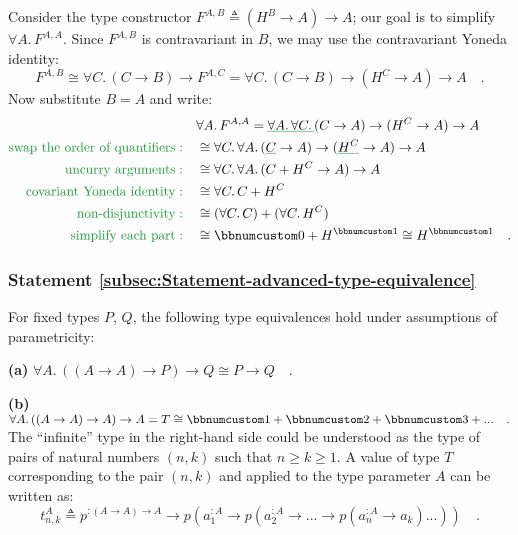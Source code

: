 Consider the type constructor $F^{A,B}\triangleq(H^{B}\rightarrow A)\rightarrow A$;
our goal is to simplify $\forall A.\,F^{A,A}$. Since $F^{A,B}$ is
contravariant in $B$, we may use the contravariant Yoneda identity:
\[
F^{A,B}\cong\forall C.\,(C\rightarrow B)\rightarrow F^{A,C}=\forall C.\,(C\rightarrow B)\rightarrow(H^{C}\rightarrow A)\rightarrow A\quad.
\]
Now substitute $B=A$ and write:
\begin{align*}
 & \forall A.\,F^{A,A}=\gunderline{\forall A.\,\forall C.\,}(C\rightarrow A)\rightarrow(H^{C}\rightarrow A)\rightarrow A\\
{\color{greenunder}\text{swap the order of quantifiers}:}\quad & \cong\forall C.\,\forall A.\,(\gunderline C\rightarrow A)\rightarrow(\gunderline{H^{C}}\rightarrow A)\rightarrow A\\
{\color{greenunder}\text{uncurry arguments}:}\quad & \cong\forall C.\,\forall A.\,(C+H^{C}\rightarrow A)\rightarrow A\\
{\color{greenunder}\text{covariant Yoneda identity}:}\quad & \cong\forall C.\,C+H^{C}\\
{\color{greenunder}\text{non-disjunctivity}:}\quad & \cong(\forall C.\,C)+(\forall C.\,H^{C})\\
{\color{greenunder}\text{simplify each part}:}\quad & \cong\bbnum 0+H^{\bbnum 1}\cong H^{\bbnum 1}\quad.
\end{align*}


\subsubsection{Statement \label{subsec:Statement-advanced-type-equivalence}\ref{subsec:Statement-advanced-type-equivalence}}

For fixed types $P$, $Q$, the following type equivalences hold under
assumptions of parametricity:

\textbf{(a)} $\forall A.\,((A\rightarrow A)\rightarrow P)\rightarrow Q\cong P\rightarrow Q\quad.$

\textbf{(b)} $\forall A.\,((A\rightarrow A)\rightarrow A)\rightarrow A=T\cong\bbnum 1+\bbnum 2+\bbnum 3+...\quad.$
The \textsf{``}infinite\textsf{''} type in the right-hand side could be understood
as the type of pairs of natural numbers $\left(n,k\right)$ such that
$n\ge k\ge1$. A value of type $T$ corresponding to the pair $\left(n,k\right)$
and applied to the type parameter $A$ can be written as:
\[
t_{n,k}^{A}\triangleq p^{:(A\rightarrow A)\rightarrow A}\rightarrow p(a_{1}^{:A}\rightarrow p(a_{2}^{:A}\rightarrow...\rightarrow p(a_{n}^{:A}\rightarrow a_{k})...))\quad.
\]

